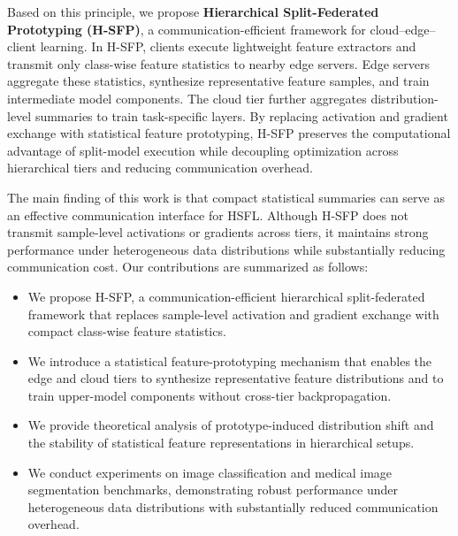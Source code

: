 Based on this principle, we propose \textbf{Hierarchical Split-Federated Prototyping (H-SFP)}, a communication-efficient framework for cloud--edge--client learning. In H-SFP, clients execute lightweight feature extractors and transmit only class-wise feature statistics to nearby edge servers. Edge servers aggregate these statistics, synthesize representative feature samples, and train intermediate model components. The cloud tier further aggregates distribution-level summaries to train task-specific layers. By replacing activation and gradient exchange with statistical feature prototyping, H-SFP preserves the computational advantage of split-model execution while decoupling optimization across hierarchical tiers and reducing communication overhead.

The main finding of this work is that compact statistical summaries can serve as an effective communication interface for HSFL. Although H-SFP does not transmit sample-level activations or gradients across tiers, it maintains strong performance under heterogeneous data distributions while substantially reducing communication cost. Our contributions are summarized as follows:
\begin{itemize}
\item We propose H-SFP, a communication-efficient hierarchical split-federated framework that replaces sample-level activation and gradient exchange with compact class-wise feature statistics.

\item We introduce a statistical feature-prototyping mechanism that enables the edge and cloud tiers to synthesize representative feature distributions and to train upper-model components without cross-tier backpropagation.

\item We provide theoretical analysis of prototype-induced distribution shift and the stability of statistical feature representations in hierarchical setups.

\item We conduct experiments on image classification and medical image segmentation benchmarks, demonstrating robust performance under heterogeneous data distributions with substantially reduced communication overhead.
\end{itemize}
